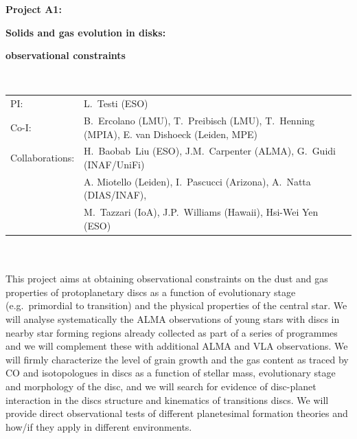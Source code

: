 \documentclass[10pt,fleqn,twoside]{article}
\begin{document}
\newpage


\setcounter{page}{1}

\centerline{\huge\bf\Tcol
%
%
%
%
%
 Project A1: }
\vspace{1em}

\centerline{\LARGE\bf\Tcol Solids and gas evolution in disks:}\vspace{0.3em}
\centerline{\LARGE\bf\Tcol observational constraints}

%
%
%
%
%
\vskip1.0cm


\\
\begin{tabular}{ll}
{\textsf{PI:}}                   & L.~Testi (ESO)\\
{\textsf{Co-I:}}                & B.~Ercolano (LMU), T.~Preibisch (LMU), T.~Henning (MPIA), E. van Dishoeck (Leiden, MPE)\\
{\textsf{Collaborations:}}      & H.~Baobab~Liu (ESO),  J.M.~Carpenter (ALMA), G.~Guidi (INAF/UniFi)\\
                                & A. Miotello (Leiden),  I.~Pascucci (Arizona), A.~Natta (DIAS/INAF),\\
                                &  M.~Tazzari (IoA), J.P.~Williams (Hawaii), Hsi-Wei Yen (ESO)\\
\end{tabular}

\vspace{1em}
 \\

\vspace{1em}
\\
This project aims at obtaining observational constraints on the dust and gas 
properties of protoplanetary discs as a function of evolutionary stage (e.g.\ primordial to transition) and 
the physical properties of the central star. We will analyse systematically
the ALMA observations of young stars with discs in nearby star forming regions already collected as part of a series of programmes and we will complement these with additional 
ALMA and VLA observations. We will firmly characterize the level of grain growth and the gas content as traced by CO and isotopologues in discs as a function of stellar mass, evolutionary stage and morphology of the disc, and we will search for evidence of disc-planet interaction in the discs structure and kinematics of transitions discs. We will provide direct observational tests of different planetesimal formation theories and how/if they apply in different environments.
\end{document}
